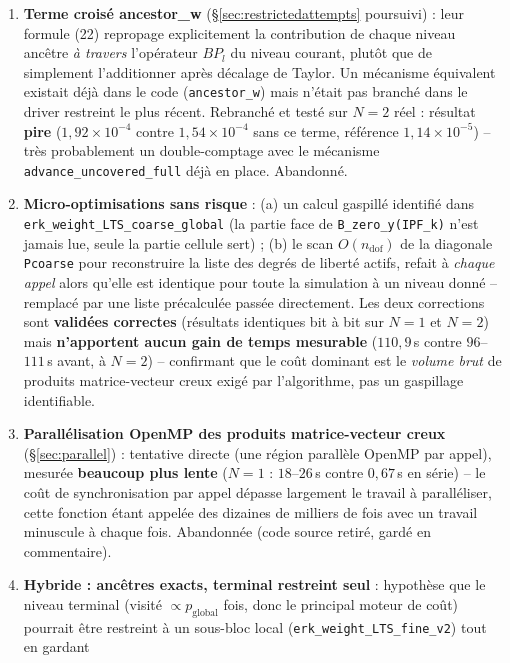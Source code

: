 \documentclass[11pt]{article}
\begin{document}
\begin{enumerate}
  \item \textbf{Terme croisé ancestor\_w} (\S\ref{sec:restrictedattempts}
  poursuivi) : leur formule (22) repropage explicitement la contribution
  de chaque niveau ancêtre \emph{à travers} l'opérateur $B P_l$ du niveau
  courant, plutôt que de simplement l'additionner après décalage de
  Taylor. Un mécanisme équivalent existait déjà dans le code
  (\texttt{ancestor\_w}) mais n'était pas branché dans le driver restreint
  le plus récent. Rebranché et testé sur $N=2$ réel : résultat
  \textbf{pire} ($1{,}92\times10^{-4}$ contre $1{,}54\times10^{-4}$ sans ce
  terme, référence $1{,}14\times10^{-5}$) -- très probablement un
  double-comptage avec le mécanisme \texttt{advance\_uncovered\_full}
  déjà en place. Abandonné.
  \item \textbf{Micro-optimisations sans risque} : (a) un calcul
  gaspillé identifié dans \texttt{erk\_weight\_LTS\_coarse\_global} (la
  partie face de \texttt{B\_zero\_y(IPF\_k)} n'est jamais lue, seule la
  partie cellule sert) ; (b) le scan $O(n_{\text{dof}})$ de la diagonale
  \texttt{Pcoarse} pour reconstruire la liste des degrés de liberté
  actifs, refait à \emph{chaque appel} alors qu'elle est identique pour
  toute la simulation à un niveau donné -- remplacé par une liste
  précalculée passée directement. Les deux corrections sont
  \textbf{validées correctes} (résultats identiques bit à bit sur $N=1$
  et $N=2$) mais \textbf{n'apportent aucun gain de temps mesurable}
  ($110{,}9$\,s contre $96$--$111$\,s avant, à $N=2$) -- confirmant que
  le coût dominant est le \emph{volume brut} de produits
  matrice-vecteur creux exigé par l'algorithme, pas un gaspillage
  identifiable.
  \item \textbf{Parallélisation OpenMP des produits matrice-vecteur
  creux} (\S\ref{sec:parallel}) : tentative directe (une région
  parallèle OpenMP par appel), mesurée \textbf{beaucoup plus lente}
  ($N{=}1$ : $18$--$26$\,s contre $0{,}67$\,s en série) -- le coût de
  synchronisation par appel dépasse largement le travail à paralléliser,
  cette fonction étant appelée des dizaines de milliers de fois avec un
  travail minuscule à chaque fois. Abandonnée (code source retiré,
  gardé en commentaire).
  \item \textbf{Hybride : ancêtres exacts, terminal restreint seul} :
  hypothèse que le niveau terminal (visité $\propto p_{\text{global}}$
  fois, donc le principal moteur de coût) pourrait être restreint à un
  sous-bloc local (\texttt{erk\_weight\_LTS\_fine\_v2}) tout en gardant

\end{enumerate}
\end{document}
